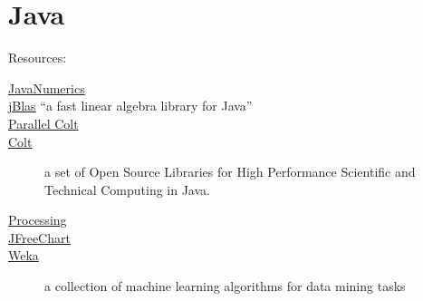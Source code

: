 \chapter{Java}

Resources:

\begin{description}
\item [\href{http://math.nist.gov/javanumerics/}{JavaNumerics}]
\item [\href{http://mikiobraun.github.io/jblas/}{jBlas} ``a fast linear algebra library for Java'']
\item [\href{https://sites.google.com/site/piotrwendykier/software/parallelcolt}{Parallel Colt}]
\item [\href{http://acs.lbl.gov/software/colt/}{Colt}] a set of Open Source Libraries for High Performance Scientific and Technical Computing in Java.
\item [\href{http://www.processing.org/}{Processing}]
\item [\href{http://www.jfree.org/jfreechart/}{JFreeChart}]
\item [\href{http://www.cs.waikato.ac.nz/ml/weka/}{Weka}]  a collection of machine learning algorithms for data mining tasks
\end{description}
